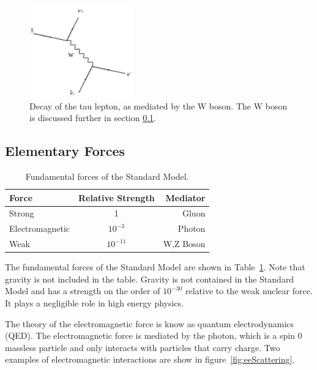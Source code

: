\documentclass[oneside, letterpaper, oldfontcommands]{memoir}
\begin{document}
\begin{figure}[here]
\includegraphics[width=0.4\textwidth]{TauDecay.pdf}
\caption{Decay of the tau lepton, as mediated by the W boson. The W boson is discussed further in section \ref{elemforces}.}
\label{fig:TauDecay}
\end{figure}

\subsection{Elementary Forces}\label{elemforces}

\begin{table}[htbp]
  \centering
  \begin{tabular}{ | l | c | r |}
    \hline
    Force & Relative Strength & Mediator \\ \hline \hline
    Strong & 1 & Gluon \\ \hline
    Electromagnetic & $10^{-3}$ & Photon \\ \hline
    Weak & $10 ^{-11}$ & W,Z Boson \\ \hline
    
  \end{tabular}
  \caption{Fundamental forces of the Standard Model\cite{Halzen:1984mc}.}
  \label{tab:FundForces}
\end{table}

\qquad The fundamental forces of the Standard Model are shown in Table~\ref{tab:FundForces}. Note that gravity is not included in the table. Gravity is not contained in the Standard Model and has a strength on the order of $10^{-30}$ \cite{Barger:0201058766} relative to the weak nuclear force. It plays a negligible role in high energy physics.

\qquad The theory of the electromagnetic force is know as quantum electrodynamics (QED). The electromagnetic force is mediated by the photon, which is a spin 0 massless particle and only interacts with particles that carry charge. Two examples of electromagnetic interactions are show in figure~\ref{fig:eeScattering}.
\end{document}
